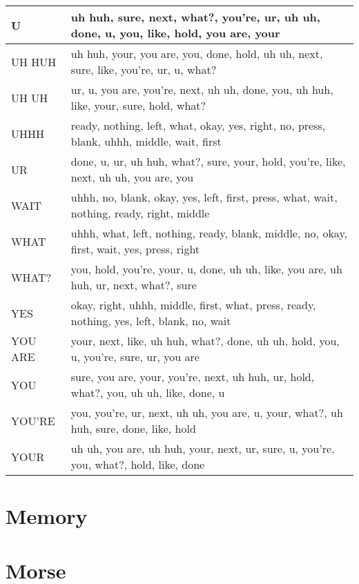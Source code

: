 \documentclass[]{article}
\begin{document}
\begin{tabular}{|l|l|}
\hline \rule[-2ex]{0pt}{5.5ex}  U		& uh huh, sure, next, what?, you're, ur, uh uh, done, u, you, like, hold, you are, your \\
\hline \rule[-2ex]{0pt}{5.5ex}  UH HUH	& uh huh, your, you are, you, done, hold, uh uh, next, sure, like, you're, ur, u, what? \\
\hline \rule[-2ex]{0pt}{5.5ex}  UH UH	& ur, u, you are, you're, next, uh uh, done, you, uh huh, like, your, sure, hold, what? \\
\hline \rule[-2ex]{0pt}{5.5ex}  UHHH	& ready, nothing, left, what, okay, yes, right, no, press, blank, uhhh, middle, wait, first \\
\hline \rule[-2ex]{0pt}{5.5ex}  UR		& done, u, ur, uh huh, what?, sure, your, hold, you're, like, next, uh uh, you are, you \\
\hline \rule[-2ex]{0pt}{5.5ex}  WAIT	& uhhh, no, blank, okay, yes, left, first, press, what, wait, nothing, ready, right, middle \\
\hline \rule[-2ex]{0pt}{5.5ex}  WHAT	& uhhh, what, left, nothing, ready, blank, middle, no, okay, first, wait, yes, press, right \\
\hline \rule[-2ex]{0pt}{5.5ex}  WHAT?	& you, hold, you're, your, u, done, uh uh, like, you are, uh huh, ur, next, what?, sure \\
\hline \rule[-2ex]{0pt}{5.5ex}  YES		& okay, right, uhhh, middle, first, what, press, ready, nothing, yes, left, blank, no, wait \\
\hline \rule[-2ex]{0pt}{5.5ex}  YOU ARE	& your, next, like, uh huh, what?, done, uh uh, hold, you, u, you're, sure, ur, you are \\
\hline \rule[-2ex]{0pt}{5.5ex}  YOU		& sure, you are, your, you're, next, uh huh, ur, hold, what?, you, uh uh, like, done, u \\
\hline \rule[-2ex]{0pt}{5.5ex}  YOU'RE	& you, you're, ur, next, uh uh, you are, u, your, what?, uh huh, sure, done, like, hold \\
\hline \rule[-2ex]{0pt}{5.5ex}  YOUR	& uh uh, you are, uh huh, your, next, ur, sure, u, you're, you, what?, hold, like, done\\
	\hline 
\end{tabular} 

\restoregeometry
\section{Memory}
\section{Morse}
\end{document}
